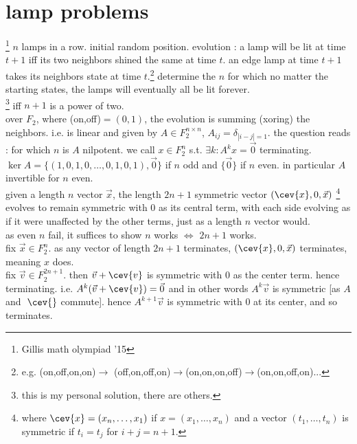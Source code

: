 \section*{lamp problems}
\footnote{Gillis math olympiad '15} $n$ lamps in a row. initial random position. 
evolution : a lamp will be lit at time $t+1$ iff its two neighbors shined the same at time $t$. 
an edge lamp at time $t+1$ takes its neighbors state at time $t$.\footnote{e.g. (on,off,on,on)$\to$
(off,on,off,on)$\to$(on,on,on,off)$\to$(on,on,off,on)...} 
determine the $n$ for which no matter the starting states, the lamps will eventually all be lit forever.\\
\footnote{this is my personal solution, there are others.} iff $n+1$ is a power of two.\\
 over $F_2$, where (on,off)$=(0,1)$, the evolution is summing (xoring) the neighbors. 
i.e. is linear and given by $A\in F_2^{n\times n}$, $A_{ij}=\delta_{|i-j|=1}$. the question reads : for which 
$n$ is $A$ nilpotent. we call $x\in F_2^n$ s.t. $\exists k : A^kx=\vec{0}$ terminating.\\
 $\ker A=\{(1,0,1,0,\dots,0,1,0,1),\vec{0}\}$ if $n$ odd and $\{\vec{0}\}$ if $n$ even. 
in particular $A$ invertible for $n$ even.\\
 given a length $n$ vector $\vec{x}$, the length $2n+1$ symmetric vector $(\cev{x},0,\vec{x})$
\footnote{where $\cev{x}=(x_n,\dots,x_1)$ if $x=(x_1,\dots,x_n)$ and a vector $(t_1,\dots,t_n)$ is 
symmetric if $t_i=t_j$ for $i+j=n+1$.} evolves to remain symmetric with $0$ as its central term, 
with each side evolving as if it were unaffected by the other terms, just as a length $n$ vector would.\\
 as even $n$ fail, it suffices to show $n$ works $\iff$ $2n+1$ works.\\
\und{$\impliedby$} fix $\vec{x}\in F_2^n$. as any vector of length $2n+1$ terminates, 
$(\cev{x},0,\vec{x})$ terminates, meaning $x$ does.\halfqed\\
\und{$\implies$} fix $\vec{v}\in F_2^{2n+1}$. then $\vec{v}+\cev{v}$ is symmetric with 
$0$ as the center term. hence terminating. i.e. $A^k(\vec{v}+\cev{v})=\vec{0}$ and in other words 
$A^k \vec{v}$ is symmetric [as $A$ and $\phantom{,}\cev{}$ commute]. hence $A^{k+1}\vec{v}$ is symmetric with 
$0$ at its center, and so terminates.\halfqed\\
